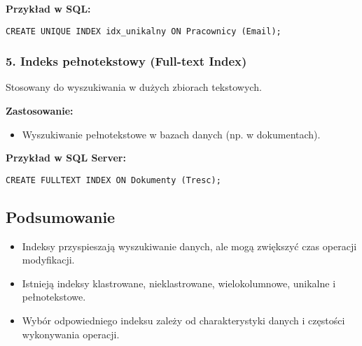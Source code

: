 \textbf{Przykład w SQL:}
\begin{verbatim}
CREATE UNIQUE INDEX idx_unikalny ON Pracownicy (Email);
\end{verbatim}

\subsubsection{5. Indeks pełnotekstowy (Full-text Index)}
Stosowany do wyszukiwania w dużych zbiorach tekstowych.

\textbf{Zastosowanie:}
\begin{itemize}
    \item Wyszukiwanie pełnotekstowe w bazach danych (np. w dokumentach).
\end{itemize}

\textbf{Przykład w SQL Server:}
\begin{verbatim}
CREATE FULLTEXT INDEX ON Dokumenty (Tresc);
\end{verbatim}

\subsection{Podsumowanie}
\begin{itemize}
    \item Indeksy przyspieszają wyszukiwanie danych, ale mogą zwiększyć czas operacji modyfikacji.
    \item Istnieją indeksy klastrowane, nieklastrowane, wielokolumnowe, unikalne i pełnotekstowe.
    \item Wybór odpowiedniego indeksu zależy od charakterystyki danych i częstości wykonywania operacji.
\end{itemize}
